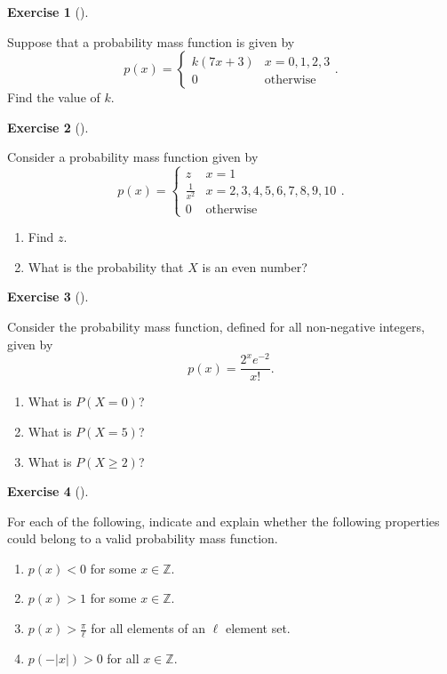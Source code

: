 \documentclass[
  letterpaper,
  DIV=11,
  numbers=noendperiod]{scrreprt}
\providecommand{\tightlist}{%
  \setlength{\itemsep}{0pt}\setlength{\parskip}{0pt}}\usepackage{longtable,booktabs,array}
\theoremstyle{definition}
\newtheorem{exercise}{Exercise}[chapter]
\theoremstyle{definition}
\theoremstyle{definition}
\theoremstyle{remark}
\begin{document}
\begin{exercise}[]\protect\hypertarget{exr-5.4}{}\label{exr-5.4}

Suppose that a probability mass function is given by
\[p(x) = \begin{cases}
    k(7x + 3) & x = 0, 1, 2, 3\\
    0 & \text{otherwise}
\end{cases}.\] Find the value of \(k\).

\end{exercise}

\begin{exercise}[]\protect\hypertarget{exr-5.5}{}\label{exr-5.5}

Consider a probability mass function given by \[p(x) = \begin{cases}
    z & x = 1 \\
    \frac{1}{x^2} & x = 2, 3, 4, 5, 6, 7, 8, 9, 10 \\
    0 & \text{otherwise}
\end{cases}.\]

\begin{enumerate}
\def\labelenumi{\alph{enumi}.}
\tightlist
\item
  Find \(z\).
\item
  What is the probability that \(X\) is an even number?
\end{enumerate}

\end{exercise}

\begin{exercise}[]\protect\hypertarget{exr-5.6}{}\label{exr-5.6}

Consider the probability mass function, defined for all non-negative
integers, given by \[p(x) = \frac{2^xe^{-2}}{x!}.\]

\begin{enumerate}
\def\labelenumi{\alph{enumi}.}
\tightlist
\item
  What is \(P(X = 0)\)?
\item
  What is \(P(X = 5)\)?
\item
  What is \(P(X \geq 2)\)?
\end{enumerate}

\end{exercise}

\begin{exercise}[]\protect\hypertarget{exr-5.7}{}\label{exr-5.7}

For each of the following, indicate and explain whether the following
properties could belong to a valid probability mass function.

\begin{enumerate}
\def\labelenumi{\alph{enumi}.}
\tightlist
\item
  \(p(x) < 0\) for some \(x \in \mathbb{Z}\).
\item
  \(p(x) > 1\) for some \(x \in\mathbb{Z}\).
\item
  \(p(x) > \frac{\pi}{\ell}\) for all elements of an \(\ell\) element
  set.
\item
  \(p(-|x|) > 0\) for all \(x\in\mathbb{Z}\).
\end{enumerate}

\end{exercise}
\end{document}
